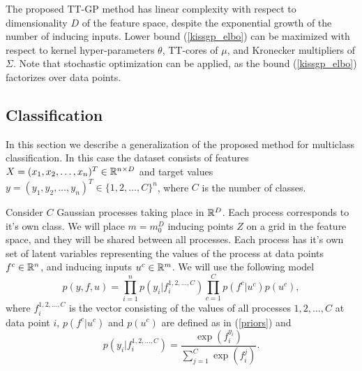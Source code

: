   The proposed TT-GP method has linear complexity with respect to dimensionality
  $D$ of the feature space, despite the exponential growth of the number of
  inducing inputs. Lower bound  (\ref{kissgp_elbo})
  can be maximized with respect to kernel hyper-parameters $\theta$, TT-cores
  of $\mu$, and Kronecker multipliers of $\Sigma$. Note that stochastic optimization
  can be applied, as the bound (\ref{kissgp_elbo}) factorizes over data points.

\subsection{Classification}

  In this section we describe a generalization of the proposed method for
  multiclass classification. In this case the dataset consists of features
  $X = (x_1, x_2, \ldots, x_n)^T \in \mathbb{R}^{n \times D}$ and target values
  $y = (y_1, y_2, \ldots, y_n)^T \in \{1, 2, \ldots, C\}^n$, where $C$ is the
  number of classes.

  Consider $C$ Gaussian processes taking place in $\mathbb{R}^D$. Each process
  corresponds to it's own class. We will place $m = m_0^D$ inducing points $Z$ on a grid
  in the feature space, and they will be shared between all processes. Each
  process has it's own set of latent variables representing the values of
  the process at data points $f^c \in \mathbb{R}^n$, and inducing inputs $u^c \in \mathbb{R}^m$.
  We will use the following model
  \[
    p(y, f, u) = \prod_{i=1}^n p\left(y_i | f_i^{1, 2, \ldots, C}\right)
      \prod_{c=1}^C p\left(f^c | u^c\right) p(u^c),
  \]
  where $f_i^{1,2,\ldots,C}$ is the vector consisting of the values of all processes
  $1, 2, \ldots, C$ at data point $i$, $p(f^c | u^c)$ and $p(u^c)$ are defined 
  as in (\ref{priors}) and 
  \[
    p(y_i | f_i^{1,2, \ldots, C}) = 
    \frac {\exp(f_i^{y_i})} {\sum_{j=1}^C\exp(f_i^j)}.
  \]
  
